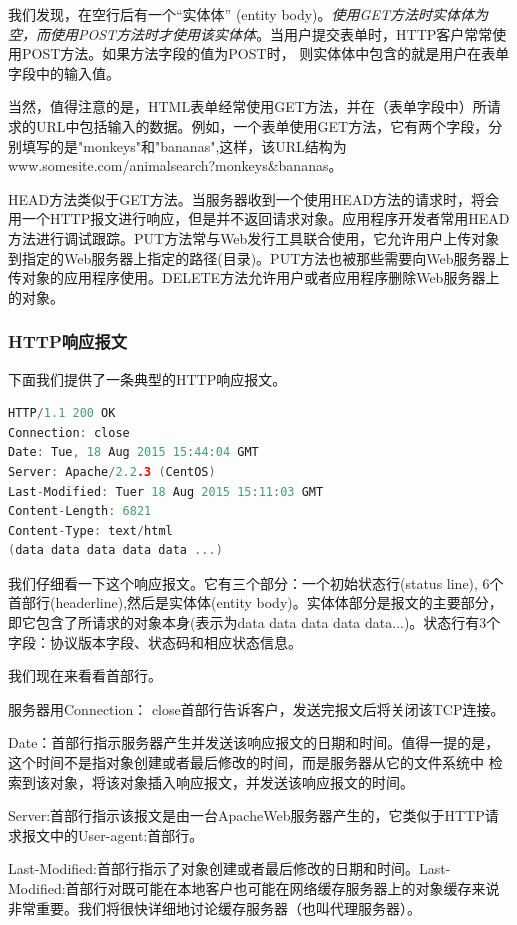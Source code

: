     我们发现，在空行后有一个“实体体” (entity body)。\emph{使用GET方法时实体体为空，而使用POST方法时才使用该实体体}。当用户提交表单时，HTTP客户常常使用POST方法。如果方法字段的值为POST时， 则实体体中包含的就是用户在表单字段中的输入值。

    当然，值得注意的是，HTML表单经常使用GET方法，并在（表单字段中）所请求的URL中包括输入的数据。例如，一个表单使用GET方法，它有两个字段，分别填写的是"monkeys"和"bananas",这样，该URL结构为www.somesite.com/animalsearch?monkeys\&bananas。

    HEAD方法类似于GET方法。当服务器收到一个使用HEAD方法的请求时，将会用一个HTTP报文进行响应，但是并不返回请求对象。应用程序开发者常用HEAD方法进行调试跟踪。PUT方法常与Web发行工具联合使用，它允许用户上传对象到指定的Web服务器上指定的路径(目录)。PUT方法也被那些需要向Web服务器上传对象的应用程序使用。DELETE方法允许用户或者应用程序删除Web服务器上的对象。

\subsubsection{HTTP响应报文}

    下面我们提供了一条典型的HTTP响应报文。

\begin{lstlisting}[language=C++]
HTTP/1.1 200 OK
Connection: close
Date: Tue, 18 Aug 2015 15:44:04 GMT
Server: Apache/2.2.3 (CentOS)
Last-Modified: Tuer 18 Aug 2015 15:11:03 GMT
Content-Length: 6821
Content-Type: text/html
(data data data data data ...)
\end{lstlisting}

    我们仔细看一下这个响应报文。它有三个部分：一个初始状态行(status line), 6个首部行(headerline),然后是实体体(entity body)。实体体部分是报文的主要部分，即它包含了所请求的对象本身(表示为data data data data data...)。状态行有3个字段：协议版本字段、状态码和相应状态信息。

    我们现在来看看首部行。
    
    服务器用Connection： close首部行告诉客户，发送完报文后将关闭该TCP连接。
    
    Date：首部行指示服务器产生并发送该响应报文的日期和时间。值得一提的是，这个时间不是指对象创建或者最后修改的时间，而是服务器从它的文件系统中 检索到该对象，将该对象插入响应报文，并发送该响应报文的时间。
    
    Server:首部行指示该报文是由一台ApacheWeb服务器产生的，它类似于HTTP请求报文中的User-agent:首部行。

    Last-Modified:首部行指示了对象创建或者最后修改的日期和时间。Last- Modified:首部行对既可能在本地客户也可能在网络缓存服务器上的对象缓存来说非常重要。我们将很快详细地讨论缓存服务器（也叫代理服务器）。
    
